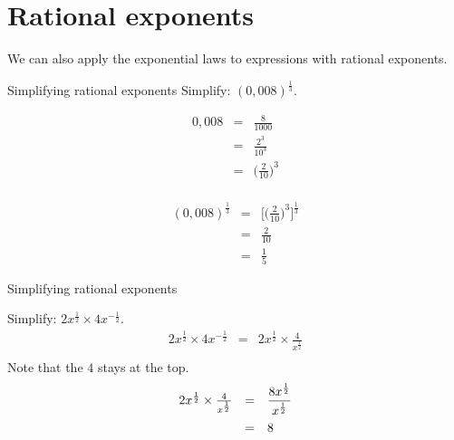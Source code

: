 \section{Rational exponents}

We can also apply the exponential laws to expressions with rational exponents.
\begin{wex}
{%
Simplifying rational exponents
} 
{%
Simplify: 
$ (0,008)^{\frac{1}{3}}.$
}
{%

\begin{eqnarray*}
 0,008 & = & \frac{8}{1000} \\
       & = & \frac{2^3}{10^3} \\
       & = & \Big(\frac{2}{10}\Big)^3\\
\end{eqnarray*}

\begin{eqnarray*}
 (0,008)^{\frac{1}{3}} & = & \Big[\Big(\frac{2}{10}\Big)^3\Big]^{\frac{1}{3}} \\
		 & = & \frac{2}{10} \\
		 & = & \frac{1}{5}
\end{eqnarray*}
}
\end{wex}

\begin{wex}
{%
Simplifying rational exponents
}

{
Simplify:
$ 2x^{\frac{1}{2}}\times 4x^{-\frac{1}{2}}. $
}
{%
\begin{eqnarray*}
 2x^{\frac{1}{2}} \times 4x^{-\frac{1}{2}} & = & 2x^{\frac{1}{2}} \times \frac{4}{x^{\frac{1}{2}}} \\
\end{eqnarray*}
Note that the $4$ stays at the top.\\

\begin{equation*}
 \begin{array}{rcl}
 2x^{\frac{1}{2}} \times \frac{4}{x^{\frac{1}{2}}} & = & \dfrac{8x^{\frac{1}{2}}}{x^{\frac{1}{2}}} \vspace{5pt} \\
					     & = & 8 
 \end{array}
\end{equation*}
}
\end{wex}

